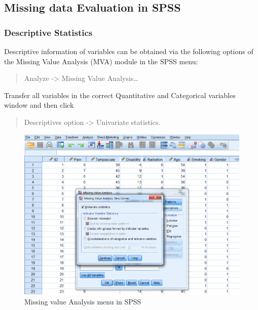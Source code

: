 \documentclass[]{book}
\begin{document}
\subsection{Missing data Evaluation in
SPSS}\label{missing-data-evaluation-in-spss}

\subsubsection{Descriptive Statistics}\label{descriptive-statistics}

Descriptive information of variables can be obtained via the following
options of the Missing Value Analysis (MVA) module in the SPSS menu:

\begin{quote}
Analyze -\textgreater{} Missing Value Analysis\ldots{}
\end{quote}

Transfer all variables in the correct Quantitative and Categorical
variables window and then click

\begin{quote}
Descriptives option -\textgreater{} Univariate statistics.
\end{quote}

\begin{figure}

{\centering \includegraphics[width=0.9\linewidth]{images/fig2.10} 

}

\caption{Missing value Analysis menu in SPSS}\label{fig:fig2-10}
\end{figure}
\end{document}
